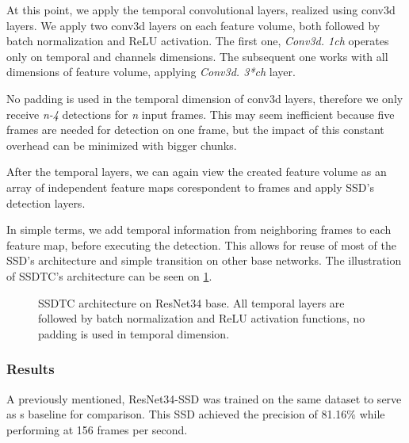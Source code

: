 At this point, we apply the temporal convolutional layers, realized using conv3d layers. We apply two conv3d layers on each feature volume, both followed by batch normalization and ReLU activation.  The first one, \textit{Conv3d. 1\x ch} operates only on temporal and channels dimensions.  The subsequent one works with all dimensions of feature volume, applying \textit{Conv3d. 3*ch} layer. 

No padding is used in the temporal dimension of conv3d layers, therefore we only receive \textit{n-4} detections for \textit{n} input frames. This may seem inefficient because five frames are needed for detection on one frame, but the impact of this constant overhead can be minimized with bigger chunks. 

After the temporal layers, we can again view the created feature volume as an array of independent feature maps corespondent to frames and apply SSD's detection layers. 

In simple terms, we add temporal information from neighboring frames to each feature map, before executing the detection. This allows for reuse of most of the SSD's architecture and simple transition on other base networks. The illustration of SSDTC's architecture can be seen on \cref{fig:ssdtc}.

\begin{figure}
    \centering
    \ssdtc
    \caption[Single Shot Detector with Temporal Convolution (SSDTC)]{SSDTC architecture on ResNet34 base. All temporal layers are followed by batch normalization and ReLU activation functions, no padding is used in temporal dimension.}
    \label{fig:ssdtc}
\end{figure}


\subsubsection{Results}
A previously mentioned, ResNet34-SSD was trained on the same dataset to serve as s baseline for comparison. This SSD achieved the precision of 81.16\% while performing at 156 frames per second. 


